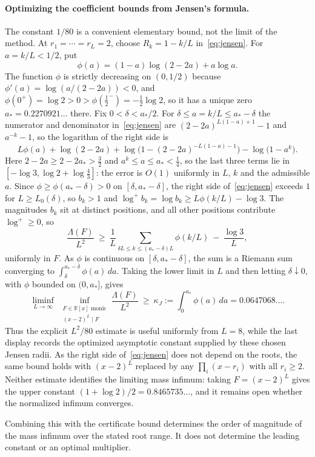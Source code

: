 \documentclass[11pt]{article}
\newcommand{\R}{\mathbb R}
\begin{document}
\paragraph{Optimizing the coefficient bounds from Jensen's formula.}
The constant $1/80$ is a convenient elementary bound, not the limit of the
method.  At $r_1=\cdots=r_L=2$, choose $R_k=1-k/L$ in~\eqref{eq:jensen}.
For $a=k/L<1/2$, put
\[
  \phi(a)=(1-a)\log(2-2a)+a\log a.
\]
The function $\phi$ is strictly decreasing on $(0,1/2)$ because
$\phi'(a)=\log(a/(2-2a))<0$, and $\phi(0^+)=\log2>0>\phi(\tfrac12^-)=-\tfrac12\log2$,
so it has a unique zero $a_\ast=0.2270921\ldots$ there.  Fix
$0<\delta<a_\ast/2$.  For $\delta\le a=k/L\le a_\ast-\delta$ the numerator and
denominator in~\eqref{eq:jensen} are $(2-2a)^{L(1-a)+1}-1$ and
$a^{-k}-1$, so the logarithm of the right side is
\[
  L\phi(a)+\log(2-2a)+\log\bigl(1-(2-2a)^{-L(1-a)-1}\bigr)
  -\log\bigl(1-a^{k}\bigr).
\]
Here $2-2a\ge2-2a_\ast>\tfrac32$ and $a^k\le a\le a_\ast<\tfrac14$, so the last
three terms lie in $[-\log3,\log2+\log\tfrac43]$: the error is $O(1)$
uniformly in $L$, $k$ and the admissible $a$.  Since
$\phi\ge\phi(a_\ast-\delta)>0$ on $[\delta,a_\ast-\delta]$, the right side
of~\eqref{eq:jensen} exceeds $1$ for $L\ge L_0(\delta)$, so $b_k>1$ and
$\log^+b_k=\log b_k\ge L\phi(k/L)-\log3$.  The magnitudes $b_k$ sit at
distinct positions, and all other positions contribute $\log^+\ge0$, so
\[
  \frac{\Lambda(F)}{L^2}\ \ge\ \frac1L\sum_{\delta L\le k\le(a_\ast-\delta)L}
  \phi(k/L)\ -\ \frac{\log3}{L},
\]
uniformly in $F$.  As $\phi$ is continuous on $[\delta,a_\ast-\delta]$, the
sum is a Riemann sum converging to $\int_\delta^{a_\ast-\delta}\phi(a)\,da$.
Taking the lower limit in $L$ and then letting $\delta\downarrow0$, with
$\phi$ bounded on $(0,a_\ast]$, gives
\[
  \liminf_{L\to\infty}\ \inf_{\substack{F\in\R[x]\text{ monic}\\(x-2)^L\mid F}}
  \frac{\Lambda(F)}{L^2}
  \ \ge\ \kappa_J:=\int_0^{a_\ast}\phi(a)\,da
  =0.0647068\ldots.
\]
Thus the explicit $L^2/80$ estimate is useful uniformly from $L=8$, while
the last display records the optimized asymptotic constant supplied by
these chosen Jensen radii.  As the right side of~\eqref{eq:jensen} does not
depend on the roots, the same bound holds with $(x-2)^L$ replaced by any
$\prod_i(x-r_i)$ with all $r_i\ge2$.  Neither estimate identifies the limiting mass
infimum: taking $F=(x-2)^L$ gives the upper constant
$(1+\log2)/2=0.8465735\ldots$, and it remains open whether the normalized
infimum converges.

Combining this with the certificate bound determines the order of magnitude
of the mass infimum over the stated root range.  It does not determine the
leading constant or an optimal multiplier.
\end{document}
